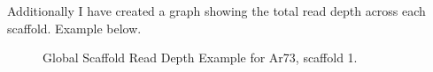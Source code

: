 \documentclass[../main.tex]{subfiles}
\begin{document}
\newpage
Additionally I have created a graph showing the total read depth across each scaffold. Example below.

\begin{figure}[H]
	\begin{centering}
				\begin{singlespace}
			\vspace{-0.5cm}
			\caption[Global Scaffold Read Depth Example]{Global Scaffold Read Depth Example for Ar73, scaffold 1.}\label{global_scaff_rd}
		\end{singlespace}
	\end{centering}
\end{figure}
\end{document}
